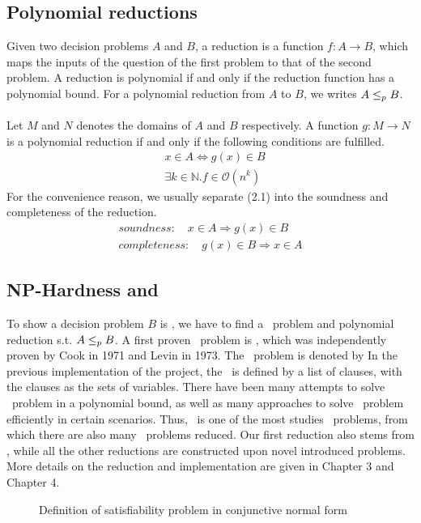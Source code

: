 \subsection{Polynomial reductions}
Given two decision problems $A$ and $B$, 
a reduction is a function $f: A \rightarrow B$, 
which maps the inputs of the question of the first problem 
to that of the second problem. A reduction is polynomial 
if and only if the reduction function has a polynomial bound. 
For a polynomial reduction from $A$ to $B$, we writes $A \leq_p B$. \\ \\
Let $M$ and $N$ denotes the domains of $A$ and $B$ respectively. 
A function $g: M \rightarrow N$ is a polynomial reduction 
if and only if the following conditions are fulfilled.
\begin{align}  
    &x \in A \iff g(x) \in B \\
    &\exists k\in \mathbb{N}. f \in \mathcal{O}(n^k)
\end{align}
For the convenience reason, we usually separate (2.1) into the soundness and completeness of the reduction.
\begin{align}
    soundness: \quad x \in A \Longrightarrow g(x) \in B \\
    completeness: \quad g(x) \in B \Longrightarrow x \in A
\end{align}

\subsection{NP-Hardness and \SAT}
To show a decision problem $B$ is \NPH, 
we have to find a \NPH\ problem and polynomial reduction 
s.t. $A \leq_p B$. A first proven \NPH\ problem is \SAT, 
which was independently proven by Cook in 1971 and Levin in 1973. 
The \SAT\ problem is denoted by 
In the previous implementation of the project, the \SAT\ is defined by a list of clauses, with the clauses as the sets of variables.
There have been many attempts to solve \SAT\ problem in a polynomial bound, 
as well as many approaches to solve \SAT\ problem efficiently in certain scenarios.
Thus, \SAT\ is one of the most studies \NPH\ problems, from which there are also many \NPH\ problems reduced. 
Our first reduction also stems from \SAT, while all the other reductions are constructed upon novel introduced problems. 
More details on the reduction and implementation are given in Chapter 3 and Chapter 4. 
\begin{figure}
    \caption{Definition of satisfiability problem in conjunctive normal form}
\end{figure}

